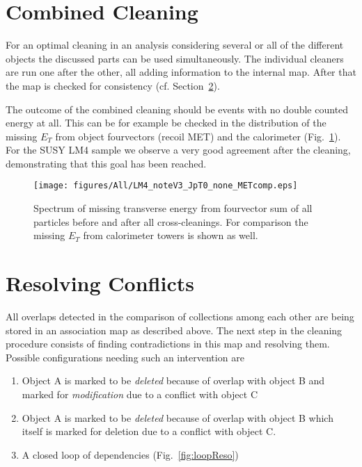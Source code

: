 \documentclass{cmspaper}
\begin{document}

\section{Combined Cleaning}
For an optimal cleaning in an analysis considering several or all of the
different objects the discussed parts can be used simultaneously. The individual
cleaners are run one after the other, all adding information to the internal
map. After that the map is checked for consistency (cf. Section~\ref{mapReso}).

The outcome of the combined cleaning should be events with no double counted
energy at all. This can be for example be checked in the distribution of the
missing $E_T$ from object fourvectors (recoil MET) and the calorimeter
(Fig.~\ref{fig:allMET}). For the SUSY LM4 sample we observe a very good
agreement after the cleaning, demonstrating that this goal has been reached.

\begin{figure}[hb]
\begin{center}
    \texttt{[image: figures/All/LM4\_noteV3\_JpT0\_none\_METcomp.eps]}
    \caption{Spectrum of missing transverse energy from fourvector sum of all
    particles before and after all cross-cleanings. For comparison
    the missing $E_T$ from calorimeter towers is shown as well.}
\label{fig:allMET}
\end{center}
\end{figure}

\section{Resolving Conflicts}
\label{mapReso}
All overlaps detected in the comparison of collections among each other are
being stored in an association map as described above. The next step in the
cleaning procedure consists of finding contradictions in this map and resolving
them.  Possible configurations needing such an intervention are
\begin{enumerate}
    \item Object A is marked to be \textit{deleted} because of overlap with
	object B and marked for \textit{modification} due to a conflict with
	object C
    \item Object A is marked to be \textit{deleted} because of overlap with
	object B which itself is marked for deletion due to a conflict with
	object C.
    \item A closed loop of dependencies (Fig.~\ref{fig:loopReso})
\end{enumerate}
\end{document}
